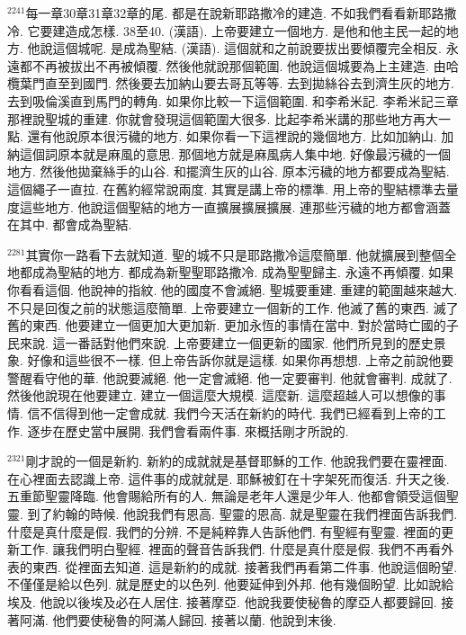\documentclass{book}
\begin{document}
$^{2241}$每一章30章31章32章的尾.
都是在說新耶路撒冷的建造.
不如我們看看新耶路撒冷.
它要建造成怎樣.
38至40.
(漢語).
上帝要建立一個地方.
是他和他主民一起的地方.
他說這個城呢.
是成為聖結.
(漢語).
這個就和之前說要拔出要傾覆完全相反.
永遠都不再被拔出不再被傾覆.
然後他就說那個範圍.
他說這個城要為上主建造.
由哈欖葉門直至到國門.
然後要去加納山要去哥瓦等等.
去到拋絲谷去到濟生灰的地方.
去到吸倫溪直到馬門的轉角.
如果你比較一下這個範圍.
和李希米記.
李希米記三章那裡說聖城的重建.
你就會發現這個範圍大很多.
比起李希米講的那些地方再大一點.
還有他說原本很污穢的地方.
如果你看一下這裡說的幾個地方.
比如加納山.
加納這個詞原本就是麻風的意思.
那個地方就是麻風病人集中地.
好像最污穢的一個地方.
然後他拋棄絲手的山谷.
和擺濟生灰的山谷.
原本污穢的地方都要成為聖結.
這個繩子一直拉.
在舊約經常說兩度.
其實是講上帝的標準.
用上帝的聖結標準去量度這些地方.
他說這個聖結的地方一直擴展擴展擴展.
連那些污穢的地方都會涵蓋在其中.
都會成為聖結.

$^{2281}$其實你一路看下去就知道.
聖的城不只是耶路撒冷這麼簡單.
他就擴展到整個全地都成為聖結的地方.
都成為新聖聖耶路撒冷.
成為聖聖歸主.
永遠不再傾覆.
如果你看看這個.
他說神的指紋.
他的國度不會滅絕.
聖城要重建.
重建的範圍越來越大.
不只是回復之前的狀態這麼簡單.
上帝要建立一個新的工作.
他滅了舊的東西.
滅了舊的東西.
他要建立一個更加大更加新.
更加永恆的事情在當中.
對於當時亡國的子民來說.
這一番話對他們來說.
上帝要建立一個更新的國家.
他們所見到的歷史景象.
好像和這些很不一樣.
但上帝告訴你就是這樣.
如果你再想想.
上帝之前說他要警醒看守他的華.
他說要滅絕.
他一定會滅絕.
他一定要審判.
他就會審判.
成就了.
然後他說現在他要建立.
建立一個這麼大規模.
這麼新.
這麼超越人可以想像的事情.
信不信得到他一定會成就.
我們今天活在新約的時代.
我們已經看到上帝的工作.
逐步在歷史當中展開.
我們會看兩件事.
來概括剛才所說的.

$^{2321}$剛才說的一個是新約.
新約的成就就是基督耶穌的工作.
他說我們要在靈裡面.
在心裡面去認識上帝.
這件事的成就就是.
耶穌被釘在十字架死而復活.
升天之後.
五重節聖靈降臨.
他會賜給所有的人.
無論是老年人還是少年人.
他都會領受這個聖靈.
到了約翰的時候.
他說我們有恩高.
聖靈的恩高.
就是聖靈在我們裡面告訴我們.
什麼是真什麼是假.
我們的分辨.
不是純粹靠人告訴他們.
有聖經有聖靈.
裡面的更新工作.
讓我們明白聖經.
裡面的聲音告訴我們.
什麼是真什麼是假.
我們不再看外表的東西.
從裡面去知道.
這是新約的成就.
接著我們再看第二件事.
他說這個盼望.
不僅僅是給以色列.
就是歷史的以色列.
他要延伸到外邦.
他有幾個盼望.
比如說給埃及.
他說以後埃及必在人居住.
接著摩亞.
他說我要使秘魯的摩亞人都要歸回.
接著阿滿.
他們要使秘魯的阿滿人歸回.
接著以蘭.
他說到末後.
\end{document}
